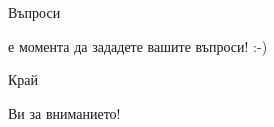 \documentclass{beamer}
\begin{document}
\begin{frame}{Въпроси}
  \begin{center} е момента да зададете вашите въпроси! :-)\end{center}
\end{frame}


\begin{frame}{Край}

  \begin{center}
     Ви за вниманието!
  \end{center}
  
\end{frame}
\end{document}
